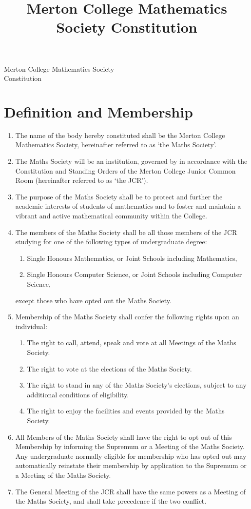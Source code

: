 \documentclass[pdftex,a4paper]{report}
\title{Merton College Mathematics Society Constitution}
\begin{document}
\begin{center}

	{\large Merton College Mathematics Society} \\[5pt]
	{\Huge Constitution}

\end{center}


\section*{Definition and Membership}

\begin{enumerate}[label=\Roman*)]
	\item The name of the body hereby constituted shall be the Merton College Mathematics Society, hereinafter referred to as `the Maths Society'.
	\item The Maths Society will be an institution, governed by in accordance with the Constitution and Standing Orders of the Merton College Junior Common Room (hereinafter referred to as `the JCR').
	\item The purpose of the Maths Society shall be to protect and further the academic interests of students of mathematics and to foster and maintain a vibrant and active mathematical community within the College.
	\item The members of the Maths Society shall be all those members of the JCR studying for one of the following types of undergraduate degree:
	\begin{enumerate}[label=\roman*)]
		\item Single Honours Mathematics, or Joint Schools including Mathematics,
		\item Single Honours Computer Science, or Joint Schools including Computer Science,
	\end{enumerate}
	except those who have opted out the Maths Society.
	\item Membership of the Maths Society shall confer the following rights upon an individual:
	\begin{enumerate}[label=\roman*)]
		\item The right to call, attend, speak and vote at all Meetings of the Maths Society.
		\item The right to vote at the elections of the Maths Society.
		\item The right to stand in any of the Maths Society's elections, subject to any additional conditions of eligibility.
		\item The right to enjoy the facilities and events provided by the Maths Society.
	\end{enumerate}
	\item All Members of the Maths Society shall have the right to opt out of this Membership by informing the Supremum or a Meeting of the Maths Society. Any undergraduate normally eligible for membership who has opted out may automatically reinstate their membership by application to the Supremum or a Meeting of the Maths Society.
	\item The General Meeting of the JCR shall have the same powers as a Meeting of the Maths Society, and shall take precedence if the two conflict. 


\end{enumerate}
\end{document}

